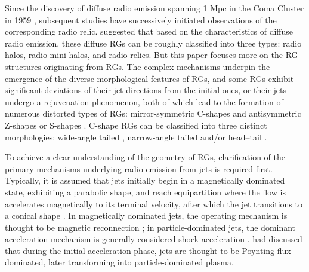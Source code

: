\documentclass{aa}
\begin{document}
Since the discovery of diffuse radio emission spanning 1 Mpc in the Coma Cluster in 1959 \citep{large_high-resolution_1959}, subsequent studies have successively initiated observations of the corresponding radio relic. \cite{feretti_clusters_2012} suggested that based on the characteristics of diffuse radio emission, these diffuse RGs can be roughly classified into three types: radio halos, radio mini-halos, and radio relics. But this paper focuses more on the RG structures originating from RGs. The complex mechanisms underpin the emergence of the diverse morphological features of RGs, and some RGs exhibit significant deviations of their jet directions from the initial ones, or their jets undergo a rejuvenation phenomenon, both of which lead to the formation of numerous distorted types of RGs: mirror-symmetric C-shapes and antisymmetric Z-shapes or S-shapes \citep{rudnick_head-tail_1976,florido_spatial_1990,liu_environment_2019}. C-shape RGs can be classified into three distinct morphologies: wide-angle tailed \citep{eilek_what_1984}, narrow-angle tailed  and/or head–tail \citep{lane_3c_2002}. 

To achieve a clear understanding of the geometry of RGs, clarification of the primary mechanisms underlying radio emission from jets is required first. Typically, it is assumed that jets initially begin in a magnetically dominated state, exhibiting a parabolic shape, and reach equipartition where the flow is accelerates magnetically to its terminal velocity, after which the jet transitions to a conical shape \citep{ghisellini_bulk_1989,potter_synchrotron_2013}. In magnetically dominated jets, the operating mechanism is thought to be magnetic reconnection \citep{giannios_role_2006}; in particle-dominated jets, the dominant acceleration mechanism is generally considered shock acceleration \citep{kirk_acceleration_1987}. \cite{agudo_studies_2015} had discussed that during the initial acceleration phase, jets are thought to be Poynting-flux dominated, later transforming into particle-dominated plasma. 
\end{document}
